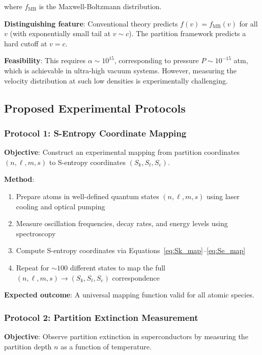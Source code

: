 where $f_{\text{MB}}$ is the Maxwell-Boltzmann distribution.

\textbf{Distinguishing feature}: Conventional theory predicts $f(v) = f_{\text{MB}}(v)$ for all $v$ (with exponentially small tail at $v \sim c$). The partition framework predicts a hard cutoff at $v = c$.

\textbf{Feasibility}: This requires $\alpha \sim 10^{15}$, corresponding to pressure $P \sim 10^{-15}$ atm, which is achievable in ultra-high vacuum systems. However, measuring the velocity distribution at such low densities is experimentally challenging.

\subsection{Proposed Experimental Protocols}

\subsubsection{Protocol 1: S-Entropy Coordinate Mapping}

\textbf{Objective}: Construct an experimental mapping from partition coordinates $(n,\ell,m,s)$ to S-entropy coordinates $(S_k, S_t, S_e)$.

\textbf{Method}:
\begin{enumerate}
    \item Prepare atoms in well-defined quantum states $(n,\ell,m,s)$ using laser cooling and optical pumping
    \item Measure oscillation frequencies, decay rates, and energy levels using spectroscopy
    \item Compute S-entropy coordinates via Equations~\eqref{eq:Sk_map}–\eqref{eq:Se_map}
    \item Repeat for $\sim 100$ different states to map the full $(n,\ell,m,s) \to (S_k, S_t, S_e)$ correspondence
\end{enumerate}

\textbf{Expected outcome}: A universal mapping function valid for all atomic species.

\subsubsection{Protocol 2: Partition Extinction Measurement}

\textbf{Objective}: Observe partition extinction in superconductors by measuring the partition depth $n$ as a function of temperature.

